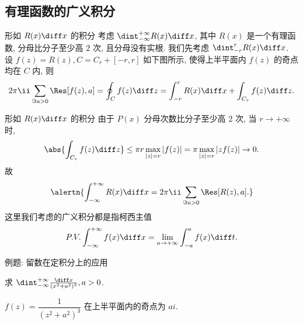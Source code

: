\subsection{有理函数的广义积分}

\begin{frame}{形如 $R(x)\diff x$ 的积分\noexer}
	\onslide<+->
	考虑 $\dint_{-\infty}^{+\infty}R(x)\diff x$, 其中 $R(x)$ 是一个有理函数, 分母比分子至少高 $2$ 次, 且分母没有实根.
	\onslide<+->
	我们先考虑 $\dint_{-r}^rR(x)\diff x$.
	\onslide<+->
	设 $f(z)=R(z),C=C_r+[-r,r]$ 如下图所示, 使得上半平面内 $f(z)$ 的奇点均在 $C$ 内,
	\onslide<+->
	则
	\[2\pi\ii\sum_{\Im a>0}\Res[f(z),a]=\oint_Cf(z)\diff z=\int_{-r}^rR(x)\diff x+\int_{C_r}f(z)\diff z.
	\]
	\onslide<3->
	\begin{center}
	\end{center}
\end{frame}


\begin{frame}{形如 $R(x)\diff x$ 的积分\noexer}
	\onslide<+->
	由于 $P(x)$ 分母次数比分子至少高 $2$ 次,
	\onslide<+->
	当 $r\to+\infty$ 时,
	\[\abs{\int_{C_r}f(z)\diff z}\le \pi r\max_{|z|=r}|f(z)|
	=\pi \max_{|z|=r}|zf(z)|\to 0.
	\]
	\onslide<+->
	故
	\[\alertn{\int_{-\infty}^{+\infty}R(x)\diff x=2\pi\ii\sum_{\Im a>0}\Res[R(z),a].}
	\]
	\onslide<+->
	这里我们考虑的广义积分都是指柯西主值
	\[P.V.\int_{-\infty}^{+\infty}f(x)\diff x=\lim_{a\to+\infty}\int_{-a}^af(x)\diff t.
	\]
\end{frame}


\begin{frame}{例题: 留数在定积分上的应用\noexer}
	\onslide<+->
	\begin{example}
		求 $\dint_{-\infty}^{+\infty}\frac{\diff x}{(x^2+a^2)^3},a>0$.
	\end{example}

	\onslide<+->
	\begin{solution}
		$f(z)=\dfrac1{(z^2+a^2)^3}$ 在上半平面内的奇点为 $ai$.
		\bigdel
		\onslide<+->{故
			\[\int_{-\infty}^{+\infty}\frac{\diff x}{(x^2+a^2)^3}
		=2\pi\ii\Res[f(z),ai]=\frac{3\pi}{8a^5}.
	\]
		}
		\vspace{-.5\baselineskip}
	\end{solution}
\end{frame}


